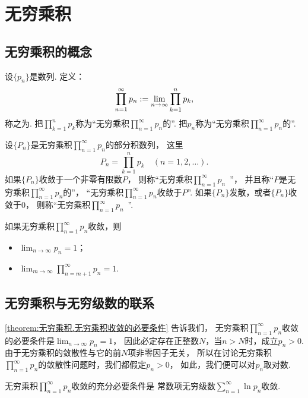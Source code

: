 \section{无穷乘积}
\subsection{无穷乘积的概念}
\begin{definition}
设\(\{p_n\}\)是数列.
定义：\begin{equation*}
	\prod_{n=1}^\infty p_n
	:=
	\lim_{n\to\infty} \prod_{k=1}^n p_k,
\end{equation*}
称之为.
把\(\prod_{k=1}^n p_k\)称为“无穷乘积\(\prod_{n=1}^\infty p_n\)的”.
把\(p_n\)称为“无穷乘积\(\prod_{n=1}^\infty p_n\)的”.

设\(\{P_n\}\)是无穷乘积\(\prod_{n=1}^\infty p_n\)的部分积数列，
这里\begin{equation*}
	P_n = \prod_{k=1}^n p_k
	\quad(n=1,2,\dotsc).
\end{equation*}
如果\(\{P_n\}\)收敛于一个非零有限数\(P\)，
则称“无穷乘积\(\prod_{n=1}^\infty p_n\)~”，
并且称“\(P\)是无穷乘积\(\prod_{n=1}^\infty p_n\)的”，
“无穷乘积\(\prod_{n=1}^\infty p_n\)收敛于\(P\)”.
如果\(\{P_n\}\)发散，或者\(\{P_n\}\)收敛于\(0\)，
则称“无穷乘积\(\prod_{n=1}^\infty p_n\)~”.
\end{definition}

\begin{theorem}\label{theorem:无穷乘积.无穷乘积收敛的必要条件}
如果无穷乘积\(\prod_{n=1}^\infty p_n\)收敛，则\begin{itemize}
	\item \(\lim_{n\to\infty} p_n = 1\)；
	\item \(\lim_{m\to\infty} \prod_{n=m+1}^\infty p_n = 1\).
\end{itemize}
\end{theorem}

\subsection{无穷乘积与无穷级数的联系}
\cref{theorem:无穷乘积.无穷乘积收敛的必要条件} 告诉我们，
无穷乘积\(\prod_{n=1}^\infty p_n\)收敛的必要条件是\(\lim_{n\to\infty} p_n = 1\)，
因此必定存在正整数\(N\)，当\(n>N\)时，成立\(p_n>0\).
由于无穷乘积的敛散性与它的前\(N\)项非零因子无关，
所以在讨论无穷乘积\(\prod_{n=1}^\infty p_n\)的敛散性问题时，我们都假定\(p_n>0\)，
如此，我们便可以对\(p_n\)取对数.
\begin{theorem}\label{theorem:无穷乘积.无穷乘积收敛性与无穷级数收敛性的联系}
无穷乘积\(\prod_{n=1}^\infty p_n\)收敛的充分必要条件是
常数项无穷级数\(\sum_{n=1}^\infty \ln p_n\)收敛.
\end{theorem}


